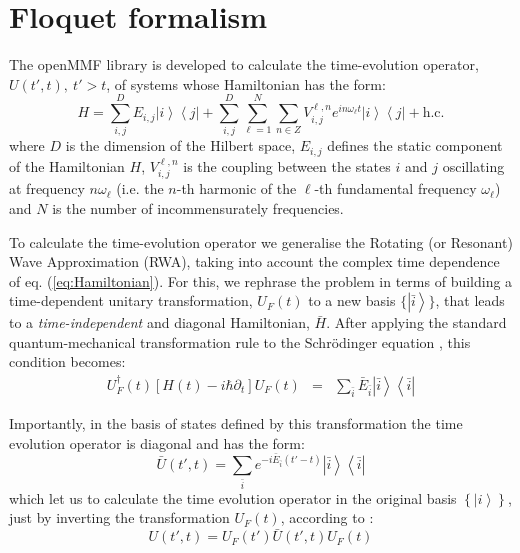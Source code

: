 \documentclass[pra,twocolumn,showkeys,preprintnumbers, amsmath,amssymb, aps,A4paper]{revtex4-1}
\begin{document}
\section{\label{sec:FloquetBloch} Floquet formalism}

The openMMF library is developed to calculate the time-evolution operator, $U(t',t), ~ t'>t$, of systems whose Hamiltonian has the form:
\begin{equation}
H = \sum_{i,j}^D E_{i,j} \left| i\right\rangle \left\langle j \right| + \sum_{i,j}^D \sum_{\ell=1}^N \sum_{n \in Z} V_{i,j}^{\ell,n} e^{i n \omega_\ell t} \left| i\right\rangle \left\langle j \right| + \textrm{h.c.}
\label{eq:Hamiltonian}
\end{equation}
where $D$ is the dimension of the Hilbert space, ${E_{i,j}}$ defines the static component of the Hamiltonian $H$, $V_{i,j}^{\ell,n}$ is the coupling between the states $i$ and $j$ oscillating at frequency $n \omega_{\ell}$ (i.e. the $n$-th harmonic of the $\ell$-th fundamental frequency $\omega_{\ell}$) and $N$ is the number of incommensurately frequencies.

To calculate the time-evolution operator we generalise the Rotating (or Resonant) Wave Approximation (RWA), taking into account the complex time dependence of eq. (\ref{eq:Hamiltonian}). For this, we rephrase the problem in terms of building a time-dependent unitary transformation, $U_F(t)$ to a new basis $\{\left| \bar{i} \right\rangle\}$, that leads to a \textit{time-independent} and diagonal Hamiltonian, $\bar{H}$. After applying the standard quantum-mechanical transformation rule to the Schr\"{o}dinger equation \cite{chu1985recent,PhysRevA.81.063626}, this condition becomes:
\begin{eqnarray}
 U_F^\dagger(t) \left[ H(t) - i \hbar \partial_t \right] U_F(t)  &=& \sum_{\bar{i}} \bar{E}_{\bar{i}} \left| \bar{i} \right\rangle \left\langle \bar{i} \right|
\label{eq:Hdressed}
\end{eqnarray}

Importantly, in the basis of states defined by this transformation the time evolution operator is diagonal and has the form:
\begin{equation}
\bar{U}(t',t) = \sum_{\bar{i}} e^{-i \bar{E}_{\bar{i}} (t'-t)} \left| \bar{i} \right\rangle \left\langle \bar{i} \right|
\label{eq:dressedtimeevolution}
\end{equation}
which let us to calculate the time evolution operator in the original basis $\left\{ \left| i\right\rangle\right\}$, just by inverting the transformation $U_F(t)$, according to \cite{PhysRevA.81.063626}:
\begin{equation}
U(t',t) = U_F(t') \bar{U}(t',t) U_F(t)
\label{eq:baretimeevolution}
\end{equation}
\end{document}
